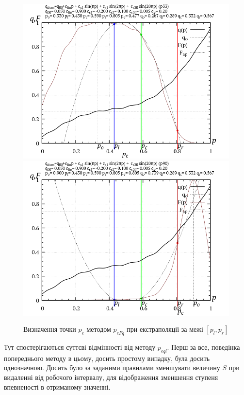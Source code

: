 \begin{figure}[htb!]
  \begin{center}
    \includegraphics[width=49\TW]{p/p_eFq/q_p_eFq_p33.png}
    \hfill
    \includegraphics[width=49\TW]{p/p_eFq/q_p_eFq_p90.png}
  \end{center}
\caption{Визначення точки $p_e$ методом $p_{eFq}$ при екстраполяції за межі $[p_l, p_r]$}
\label{atu:f:p_eFq_extra}
\end{figure}

Тут спостерігаються суттєві відмінності від методу
$p_{eql}$. Перш за все, поведінка попереднього методу в цьому,
досить простому випадку, була досить однозначною. Досить було
за заданими правилами зменшувати величину
$S$ при видаленні від робочого інтервалу, для відображення
зменшення ступеня впевненості в отриманому значенні.

